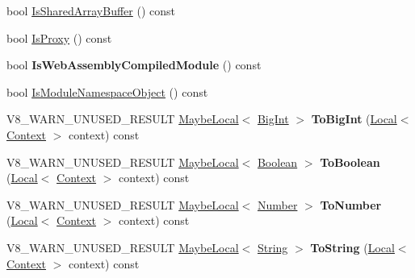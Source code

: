 \begin{DoxyCompactItemize}
bool \mbox{\hyperlink{classv8_1_1Value_a1d7d90fe704feab89dcbdc383ab298b2}{Is\+Shared\+Array\+Buffer}} () const
\item 
bool \mbox{\hyperlink{classv8_1_1Value_a3c0ad01f2ca4ac050ef8214785848918}{Is\+Proxy}} () const
\item 
\mbox{\label{classv8_1_1Value_afca9fc3c0149433e8df15317d2b15590}} 
bool {\bfseries Is\+Web\+Assembly\+Compiled\+Module} () const
\item 
bool \mbox{\hyperlink{classv8_1_1Value_aa6c9cb065da30b0b58b929ecaa80a1ab}{Is\+Module\+Namespace\+Object}} () const
\item 
\mbox{\label{classv8_1_1Value_ad148cfd0e9e58ef94c4ee2150a092fb0}} 
V8\+\_\+\+W\+A\+R\+N\+\_\+\+U\+N\+U\+S\+E\+D\+\_\+\+R\+E\+S\+U\+LT \mbox{\hyperlink{classv8_1_1MaybeLocal}{Maybe\+Local}}$<$ \mbox{\hyperlink{classv8_1_1BigInt}{Big\+Int}} $>$ {\bfseries To\+Big\+Int} (\mbox{\hyperlink{classv8_1_1Local}{Local}}$<$ \mbox{\hyperlink{classv8_1_1Context}{Context}} $>$ context) const
\item 
\mbox{\label{classv8_1_1Value_af8f9b7abdc0fffbd193a9e026605834b}} 
V8\+\_\+\+W\+A\+R\+N\+\_\+\+U\+N\+U\+S\+E\+D\+\_\+\+R\+E\+S\+U\+LT \mbox{\hyperlink{classv8_1_1MaybeLocal}{Maybe\+Local}}$<$ \mbox{\hyperlink{classv8_1_1Boolean}{Boolean}} $>$ {\bfseries To\+Boolean} (\mbox{\hyperlink{classv8_1_1Local}{Local}}$<$ \mbox{\hyperlink{classv8_1_1Context}{Context}} $>$ context) const
\item 
\mbox{\label{classv8_1_1Value_a750b6ca8a0a5bda092094560b98cbd0f}} 
V8\+\_\+\+W\+A\+R\+N\+\_\+\+U\+N\+U\+S\+E\+D\+\_\+\+R\+E\+S\+U\+LT \mbox{\hyperlink{classv8_1_1MaybeLocal}{Maybe\+Local}}$<$ \mbox{\hyperlink{classv8_1_1Number}{Number}} $>$ {\bfseries To\+Number} (\mbox{\hyperlink{classv8_1_1Local}{Local}}$<$ \mbox{\hyperlink{classv8_1_1Context}{Context}} $>$ context) const
\item 
\mbox{\label{classv8_1_1Value_a45d48ed5aee0b3f628193f8f2981a49b}} 
V8\+\_\+\+W\+A\+R\+N\+\_\+\+U\+N\+U\+S\+E\+D\+\_\+\+R\+E\+S\+U\+LT \mbox{\hyperlink{classv8_1_1MaybeLocal}{Maybe\+Local}}$<$ \mbox{\hyperlink{classv8_1_1String}{String}} $>$ {\bfseries To\+String} (\mbox{\hyperlink{classv8_1_1Local}{Local}}$<$ \mbox{\hyperlink{classv8_1_1Context}{Context}} $>$ context) const

\end{DoxyCompactItemize}
